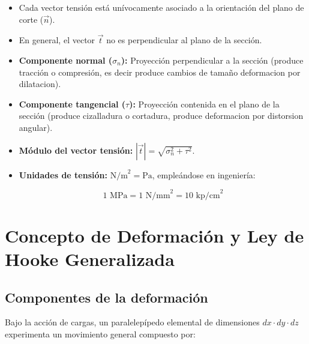 \begin{itemize}

    \item Cada vector tensión está unívocamente asociado a la orientación del plano de corte ($\vec{n}$).

    \item En general, el vector $\vec{t}$ no es perpendicular al plano de la sección.

    \item \textbf{Componente normal ($\sigma_n$):} Proyección perpendicular a la sección (produce tracción o compresión, es decir produce cambios de tamaño deformacion por dilatacion).

    \item \textbf{Componente tangencial ($\tau$):} Proyección contenida en el plano de la sección (produce cizalladura o cortadura, produce deformacion por distorsion angular).

    \item \textbf{Módulo del vector tensión:} $|\vec{t}| = \sqrt{\sigma_n^2 + \tau^2}$.

    \item \textbf{Unidades de tensión:} $\text{N/m}^2 = \text{Pa}$, empleándose en ingeniería:

          \begin{equation}

              1\text{ MPa} = 1\text{ N/mm}^2 = 10\text{ kp/cm}^2

          \end{equation}

\end{itemize}




\section{Concepto de Deformación y Ley de Hooke Generalizada}



\subsection{Componentes de la deformación}

Bajo la acción de cargas, un paralelepípedo elemental de dimensiones $dx \cdot dy \cdot dz$ experimenta un movimiento general compuesto por:

